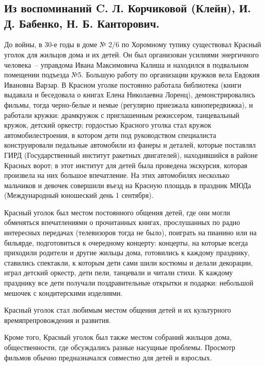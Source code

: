 \chapter{}

\section*{Из воспоминаний C. Л. Корчиковой (Клейн), И. Д. Бабенко, Н. Б. Канторович.}

До войны, в 30-е годы в доме № 2/6 по Хоромному тупику существовал Красный уголок для жильцов дома и их детей. Он был организован усилиями энергичного человека~-- управдома Ивана Максимовича Калиша и находился в подвальном помещении подъезда №5. Большую работу по организации кружков вела Евдокия Ивановна Варзар. В Красном уголке постоянно работала библиотека (книги выдавала и беседовала о книгах Елена Николаевна Лоренц), демонстрировались фильмы, тогда черно-белые и немые (регулярно приезжала кинопередвижка), и работали кружки: драмкружок с приглашенным режиссером,   танцевальный   кружок, детский   оркестр; гордостью    Красного уголка стал    кружок автомобилестроения,   в   котором дети под руководством специалиста конструировали     педальные   автомобили   из   фанеры и деталей, которые поставлял ГИРД (Государственный   институт ракетных двигателей), находившийся в   районе   Красных   ворот;   в этот институт для детей   была проведена  экскурсия,    которая  произвела на  них    большое   впечатление. На этих автомобилях несколько мальчиков и   девочек совершили   въезд  на Красную площадь    в   праздник МЮДа   (Международный   юношеский день 1 сентября).

Красный уголок был местом постоянного общения  детей, где они могли обменяться впечатлениями о прочитанных книгах,    прослушанных   по   радио интересных передачах (телевизоров тогда не было), поиграть на пианино или на бильярде, подготовиться      к очередному концерту: концерты,   на   которые всегда приходили   родители и   другие жильцы дома, готовились    к каждому празднику, ставились спектакли, к которым дети сами шили костюмы и делали декорации,   играл   детский оркестр,   дети     пели, танцевали и читали стихи. К каждому празднику все   дети получали поздравительные открытки и подарки:   небольшой   мешочек   с кондитерскими изделиями.

Красный уголок стал любимым местом общения детей и их культурного времяпрепровождения и развития.


Кроме того, Красный уголок был также местом собраний жильцов дома, общественности, где обсуждались разные насущные проблемы. Просмотр фильмов обычно предназначался совместно для детей и взрослых.

